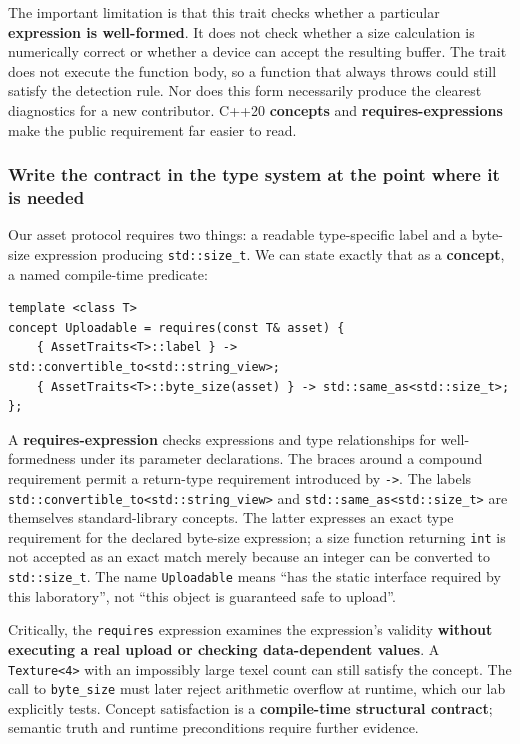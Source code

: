 The important limitation is that this trait checks whether a particular \textbf{expression is well-formed}. It does not check whether a size calculation is numerically correct or whether a device can accept the resulting buffer. The trait does not execute the function body, so a function that always throws could still satisfy the detection rule. Nor does this form necessarily produce the clearest diagnostics for a new contributor. C++20 \textbf{concepts} and \textbf{requires-expressions} make the public requirement far easier to read.

\subsubsection{Write the contract in the type system at the point where it is needed}\label{write-the-contract-in-the-type-system-at-the-point-where-it-is-needed}

Our asset protocol requires two things: a readable type-specific label and a byte-size expression producing \texttt{std::size\_t}. We can state exactly that as a \textbf{concept}, a named compile-time predicate:

\begin{verbatim}
template <class T>
concept Uploadable = requires(const T& asset) {
    { AssetTraits<T>::label } -> std::convertible_to<std::string_view>;
    { AssetTraits<T>::byte_size(asset) } -> std::same_as<std::size_t>;
};
\end{verbatim}

A \textbf{requires-expression} checks expressions and type relationships for well-formedness under its parameter declarations. The braces around a compound requirement permit a return-type requirement introduced by \texttt{-\textgreater{}}. The labels \texttt{std::convertible\_to\textless{}std::string\_view\textgreater{}} and \texttt{std::same\_as\textless{}std::size\_t\textgreater{}} are themselves standard-library concepts. The latter expresses an exact type requirement for the declared byte-size expression; a size function returning \texttt{int} is not accepted as an exact match merely because an integer can be converted to \texttt{std::size\_t}. The name \texttt{Uploadable} means ``has the static interface required by this laboratory'', not ``this object is guaranteed safe to upload''.

Critically, the \texttt{requires} expression examines the expression's validity \textbf{without executing a real upload or checking data-dependent values}. A \texttt{Texture\textless{}4\textgreater{}} with an impossibly large texel count can still satisfy the concept. The call to \texttt{byte\_size} must later reject arithmetic overflow at runtime, which our lab explicitly tests. Concept satisfaction is a \textbf{compile-time structural contract}; semantic truth and runtime preconditions require further evidence.


